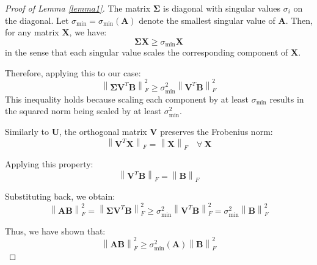 \begin{proof}[Proof of Lemma \ref{lemma1}]
The matrix \(\boldsymbol{\Sigma}\) is diagonal with singular values \(\sigma_i\) on the diagonal. Let \(\sigma_{\min} = \sigma_{\min}(\boldsymbol{A})\) denote the smallest singular value of \(\boldsymbol{A}\). Then, for any matrix \(\boldsymbol{X}\), we have:
\begin{equation}
\boldsymbol{\Sigma} \boldsymbol{X} \geq \sigma_{\min} \boldsymbol{X}
\end{equation}
in the sense that each singular value scales the corresponding component of \(\boldsymbol{X}\).

Therefore, applying this to our case:
\begin{equation}
\left\lVert \boldsymbol{\Sigma} \boldsymbol{V}^T \boldsymbol{B} \right\rVert_F^2 \geq \sigma_{\min}^2 \left\lVert \boldsymbol{V}^T \boldsymbol{B} \right\rVert_F^2
\end{equation}
This inequality holds because scaling each component by at least \(\sigma_{\min}\) results in the squared norm being scaled by at least \(\sigma_{\min}^2\).

Similarly to \(\boldsymbol{U}\), the orthogonal matrix \(\boldsymbol{V}\) preserves the Frobenius norm:
\begin{equation}
\left\lVert \boldsymbol{V}^T \boldsymbol{X} \right\rVert_F = \left\lVert \boldsymbol{X} \right\rVert_F \quad \forall \ \boldsymbol{X}
\end{equation}

Applying this property:
\begin{equation}
\left\lVert \boldsymbol{V}^T \boldsymbol{B} \right\rVert_F = \left\lVert \boldsymbol{B} \right\rVert_F
\end{equation}

Substituting back, we obtain:
\begin{equation}
\left\lVert \boldsymbol{AB} \right\rVert_F^2 = \left\lVert \boldsymbol{\Sigma} \boldsymbol{V}^T \boldsymbol{B} \right\rVert_F^2 \geq \sigma_{\min}^2 \left\lVert \boldsymbol{V}^T \boldsymbol{B} \right\rVert_F^2 = \sigma_{\min}^2 \left\lVert \boldsymbol{B} \right\rVert_F^2
\end{equation}

Thus, we have shown that:
\begin{equation}
\left\lVert \boldsymbol{AB} \right\rVert_F^2 \geq \sigma_{\min}^2 (\boldsymbol{A}) \left\lVert \boldsymbol{B} \right\rVert_F^2
\end{equation}
\end{proof}


